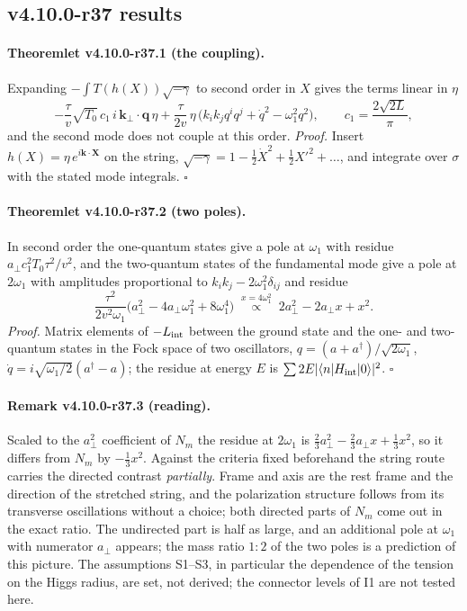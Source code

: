 \subsection*{v4.10.0-r37 results}
\label{subsec:v4100-r37-results}

\paragraph{Theoremlet v4.10.0-r37.1 (the coupling).}
Expanding \(-\int T(h(X))\sqrt{-\gamma}\) to second order in \(X\) gives the terms linear in \(\eta\)
\[
 -\frac{\tau}{v}\sqrt{T_0}\,c_1\,i\,\mathbf k_\perp\!\cdot\mathbf q\,\eta+\frac{\tau}{2v}\,\eta\,\bigl(k_ik_jq^iq^j+\dot q^2-\omega_1^2q^2\bigr),\qquad c_1=\frac{2\sqrt{2L}}{\pi},
\]
and the second mode does not couple at this order.  \emph{Proof.} Insert \(h(X)=\eta\,e^{i\mathbf k\cdot\mathbf X}\) on the string,
\(\sqrt{-\gamma}=1-\tfrac12\dot X^2+\tfrac12X'^2+\dots\), and integrate over \(\sigma\) with the stated mode integrals.  \(\square\)

\paragraph{Theoremlet v4.10.0-r37.2 (two poles).}
In second order the one-quantum states give a pole at \(\omega_1\) with residue \(a_\perp c_1^2T_0\tau^2/v^2\), and the two-quantum states of the fundamental
mode give a pole at \(2\omega_1\) with amplitudes proportional to \(k_ik_j-2\omega_1^2\delta_{ij}\) and residue
\[
 \frac{\tau^2}{2v^2\omega_1}\bigl(a_\perp^2-4a_\perp\omega_1^2+8\omega_1^4\bigr)\;\overset{x=4\omega_1^2}{\propto}\;2a_\perp^2-2a_\perp x+x^2 .
\]
\emph{Proof.} Matrix elements of \(-L_{\rm int}\) between the ground state and the one- and two-quantum states in the Fock space of two oscillators,
\(q=(a+a^\dagger)/\sqrt{2\omega_1}\), \(\dot q=i\sqrt{\omega_1/2}(a^\dagger-a)\); the residue at energy \(E\) is \(\sum2E|\langle n|H_{\rm int}|0\rangle|^2\).  \(\square\)

\paragraph{Remark v4.10.0-r37.3 (reading).}
Scaled to the \(a_\perp^2\) coefficient of \(N_m\) the residue at \(2\omega_1\) is \(\tfrac23a_\perp^2-\tfrac23a_\perp x+\tfrac13x^2\), so it differs from \(N_m\) by \(-\tfrac13x^2\).
Against the criteria fixed beforehand the string route carries the directed contrast \emph{partially}.  Frame and axis are the rest frame and
the direction of the stretched string, and the polarization structure follows from its transverse oscillations without a choice; both
directed parts of \(N_m\) come out in the exact ratio.  The undirected part is half as large, and an additional pole at \(\omega_1\) with numerator
\(a_\perp\) appears; the mass ratio \(1:2\) of the two poles is a prediction of this picture.  The assumptions S1--S3, in particular the dependence
of the tension on the Higgs radius, are set, not derived; the connector levels of I1 are not tested here.

